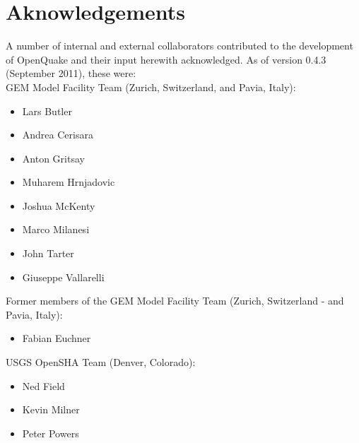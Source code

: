 \chapter*{Aknowledgements}
A number of internal and external collaborators contributed to 
the development of OpenQuake and their input herewith acknowledged. 
As of version 0.4.3 (September 2011), these were: \hfill \\
GEM Model Facility Team (Zurich, Switzerland, and Pavia, Italy): 
\begin{itemize}
\item Lars Butler
\item Andrea Cerisara
\item Anton Gritsay
\item Muharem Hrnjadovic
\item Joshua McKenty
\item Marco Milanesi
\item John Tarter
\item Giuseppe Vallarelli
\end{itemize}
Former members of the GEM Model Facility Team (Zurich, Switzerland -  
and Pavia, Italy): 
\begin{itemize}
\item Fabian Euchner
\end{itemize}
USGS OpenSHA Team (Denver, Colorado): 
\begin{itemize}
\item Ned Field
\item Kevin Milner
\item Peter Powers
\end{itemize}

